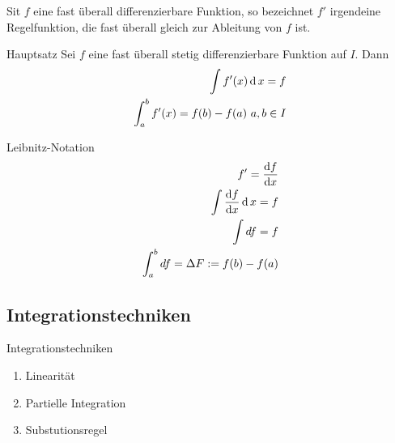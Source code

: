 \begin{Def}
  Sit $f$ eine fast überall differenzierbare Funktion, so bezeichnet $f'$ irgendeine Regelfunktion, die fast überall gleich zur Ableitung von $f$ ist.
\end{Def}
\begin{Sat}{Hauptsatz}
  Sei $f$ eine fast überall stetig differenzierbare Funktion auf $I$. Dann 
  \begin{align*}
    \int f'(x)\operatorname{d} x=f\\
    \int_a^bf'(x)=f(b)-f(a)\ a,b\in I
  \end{align*}
\end{Sat}
\begin{Not}{Leibnitz-Notation}
  \begin{align*}
    f'=\displaystyle\frac{\mathrm{d}f}{\mathrm{d}x}\\
    \int\displaystyle\frac{\mathrm{d}f}{\mathrm{d}x}\operatorname{d} x=f\\
    \int df=f\\
    \int^b_adf=\Delta F:=f(b)-f(a)
  \end{align*}
\end{Not}
\subsection{Integrationstechniken}
\begin{Eig}{Integrationstechniken}
  \begin{enumerate}
    \item Linearität
    \item Partielle Integration
    \item Substutionsregel
  \end{enumerate}
\end{Eig}
